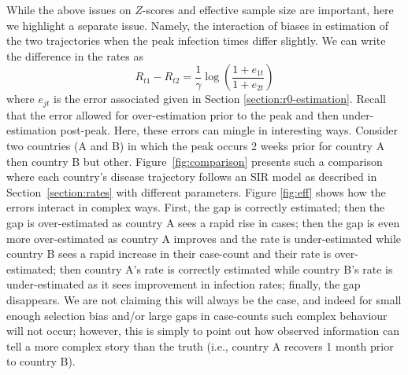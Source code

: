 \documentclass[aoas]{amsart}
\begin{document}
While the above issues on $Z$-scores and effective sample size are important, here we highlight a separate issue.  Namely, the interaction of biases in estimation of the two trajectories when the peak infection times differ slightly.  We can write the difference in the rates as
$$
R_{t1} - R_{t2} = \frac{1}{\gamma} \log \left( \frac{1 + e_{1t}}{1+e_{2t}} \right)
$$
where $e_{jt}$ is the error associated given in Section \ref{section:r0-estimation}.  Recall that the error allowed for over-estimation prior to the peak and then under-estimation post-peak.  Here, these errors can mingle in interesting ways.  Consider two countries (A and B) in which the peak occurs 2 weeks prior for country A then country B but other.  Figure~\ref{fig:comparison} presents such a comparison where each country's disease trajectory follows an SIR model as described in Section~\ref{section:rates} with different parameters.  Figure \ref{fig:eff} shows how the errors interact in complex ways.  First, the gap is correctly estimated; then the gap is over-estimated as country A sees a rapid rise in cases; then the gap is even more over-estimated as country A improves and the rate is under-estimated while country B sees a rapid increase in their case-count and their rate is over-estimated; then country A's rate is correctly estimated while country B's rate is under-estimated as it sees improvement in infection rates; finally, the gap disappears.  We are not claiming this will always be the case, and indeed for small enough selection bias and/or large gaps in case-counts such complex behaviour will not occur; however, this is simply to point out how observed information can tell a more complex story than the truth (i.e., country A recovers 1 month prior to country B).
\end{document}
